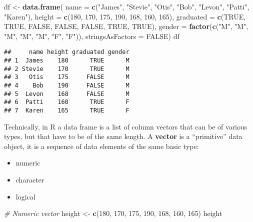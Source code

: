 \documentclass[]{book}
\newenvironment{Shaded}{\begin{snugshade}}{\end{snugshade}}
\newcommand{\KeywordTok}[1]{\textcolor[rgb]{0.13,0.29,0.53}{\textbf{{#1}}}}
\newcommand{\DataTypeTok}[1]{\textcolor[rgb]{0.13,0.29,0.53}{{#1}}}
\newcommand{\DecValTok}[1]{\textcolor[rgb]{0.00,0.00,0.81}{{#1}}}
\newcommand{\StringTok}[1]{\textcolor[rgb]{0.31,0.60,0.02}{{#1}}}
\newcommand{\CommentTok}[1]{\textcolor[rgb]{0.56,0.35,0.01}{\textit{{#1}}}}
\newcommand{\OtherTok}[1]{\textcolor[rgb]{0.56,0.35,0.01}{{#1}}}
\newcommand{\NormalTok}[1]{{#1}}
\providecommand{\tightlist}{%
  \setlength{\itemsep}{0pt}\setlength{\parskip}{0pt}}
\def\tightlist{}
\begin{document}
\begin{Shaded}
\begin{Highlighting}[]
\NormalTok{df <-}\StringTok{ }\KeywordTok{data.frame}\NormalTok{(}
  \DataTypeTok{name =} \KeywordTok{c}\NormalTok{(}\StringTok{"James"}\NormalTok{, }\StringTok{"Stevie"}\NormalTok{, }\StringTok{"Otis"}\NormalTok{, }\StringTok{"Bob"}\NormalTok{, }\StringTok{"Levon"}\NormalTok{, }\StringTok{"Patti"}\NormalTok{, }\StringTok{"Karen"}\NormalTok{), }
  \DataTypeTok{height =} \KeywordTok{c}\NormalTok{(}\DecValTok{180}\NormalTok{, }\DecValTok{170}\NormalTok{, }\DecValTok{175}\NormalTok{, }\DecValTok{190}\NormalTok{, }\DecValTok{168}\NormalTok{, }\DecValTok{160}\NormalTok{, }\DecValTok{165}\NormalTok{), }
  \DataTypeTok{graduated =} \KeywordTok{c}\NormalTok{(}\OtherTok{TRUE}\NormalTok{, }\OtherTok{TRUE}\NormalTok{, }\OtherTok{FALSE}\NormalTok{, }\OtherTok{FALSE}\NormalTok{, }\OtherTok{FALSE}\NormalTok{, }\OtherTok{TRUE}\NormalTok{, }\OtherTok{TRUE}\NormalTok{),}
  \DataTypeTok{gender =} \KeywordTok{factor}\NormalTok{(}\KeywordTok{c}\NormalTok{(}\StringTok{"M"}\NormalTok{, }\StringTok{"M"}\NormalTok{, }\StringTok{"M"}\NormalTok{, }\StringTok{"M"}\NormalTok{, }\StringTok{"M"}\NormalTok{, }\StringTok{"F"}\NormalTok{, }\StringTok{"F"}\NormalTok{)), }
  \DataTypeTok{stringsAsFactors =} \OtherTok{FALSE}\NormalTok{)}
\NormalTok{df}
\end{Highlighting}
\end{Shaded}

\begin{verbatim}
##     name height graduated gender
## 1  James    180      TRUE      M
## 2 Stevie    170      TRUE      M
## 3   Otis    175     FALSE      M
## 4    Bob    190     FALSE      M
## 5  Levon    168     FALSE      M
## 6  Patti    160      TRUE      F
## 7  Karen    165      TRUE      F
\end{verbatim}

Technically, in R a data frame is a list of column vectors that can be
of various types, but that have to be of the same length. A
\textbf{vector} is a ``primitive'' data object, it is a sequence of data
elements of the same basic type:

\begin{itemize}
\tightlist
\item
  numeric
\item
  character
\item
  logical
\end{itemize}

\begin{Shaded}
\begin{Highlighting}[]
\CommentTok{# Numeric vector}
\NormalTok{height <-}\StringTok{ }\KeywordTok{c}\NormalTok{(}\DecValTok{180}\NormalTok{, }\DecValTok{170}\NormalTok{, }\DecValTok{175}\NormalTok{, }\DecValTok{190}\NormalTok{, }\DecValTok{168}\NormalTok{, }\DecValTok{160}\NormalTok{, }\DecValTok{165}\NormalTok{)}
\NormalTok{height}
\end{Highlighting}
\end{Shaded}
\end{document}
